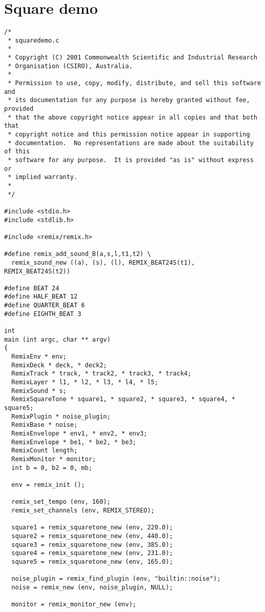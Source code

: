 \section{Square demo}
\label{group__squaredemo}


\footnotesize\begin{verbatim}/*
 * squaredemo.c
 *
 * Copyright (C) 2001 Commonwealth Scientific and Industrial Research
 * Organisation (CSIRO), Australia.
 *
 * Permission to use, copy, modify, distribute, and sell this software and
 * its documentation for any purpose is hereby granted without fee, provided
 * that the above copyright notice appear in all copies and that both that
 * copyright notice and this permission notice appear in supporting
 * documentation.  No representations are made about the suitability of this
 * software for any purpose.  It is provided "as is" without express or
 * implied warranty.
 *
 */

#include <stdio.h>
#include <stdlib.h>

#include <remix/remix.h>

#define remix_add_sound_B(a,s,l,t1,t2) \
  remix_sound_new ((a), (s), (l), REMIX_BEAT24S(t1), REMIX_BEAT24S(t2))

#define BEAT 24
#define HALF_BEAT 12
#define QUARTER_BEAT 6
#define EIGHTH_BEAT 3

int
main (int argc, char ** argv)
{
  RemixEnv * env;
  RemixDeck * deck, * deck2;
  RemixTrack * track, * track2, * track3, * track4;
  RemixLayer * l1, * l2, * l3, * l4, * l5;
  RemixSound * s;
  RemixSquareTone * square1, * square2, * square3, * square4, * square5;
  RemixPlugin * noise_plugin;
  RemixBase * noise;
  RemixEnvelope * env1, * env2, * env3;
  RemixEnvelope * be1, * be2, * be3;
  RemixCount length;
  RemixMonitor * monitor;
  int b = 0, b2 = 0, mb;

  env = remix_init ();

  remix_set_tempo (env, 160);
  remix_set_channels (env, REMIX_STEREO);

  square1 = remix_squaretone_new (env, 220.0);
  square2 = remix_squaretone_new (env, 440.0);
  square3 = remix_squaretone_new (env, 385.0);
  square4 = remix_squaretone_new (env, 231.0);
  square5 = remix_squaretone_new (env, 165.0);

  noise_plugin = remix_find_plugin (env, "builtin::noise");
  noise = remix_new (env, noise_plugin, NULL);

  monitor = remix_monitor_new (env);


\end{verbatim}
